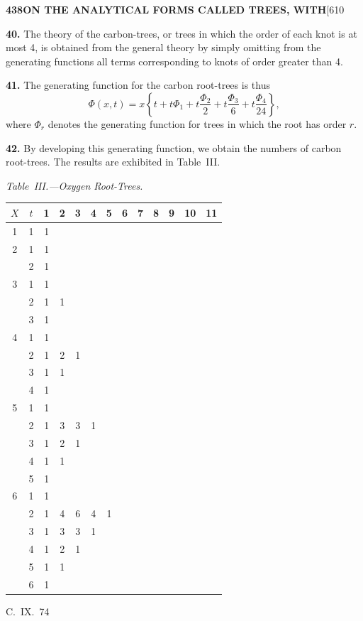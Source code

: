\documentclass[11pt,a4paper]{book}
\begin{document}
{\newpage
\noindent\textbf{438}\hspace{\fill}\textbf{ON THE ANALYTICAL FORMS CALLED TREES, WITH}\hspace{\fill}[610

\noindent\textbf{40.}
The theory of the carbon-trees, or trees in which the order of each knot is at most 4, is obtained from the general theory by simply omitting from the generating functions all terms corresponding to knots of order greater than 4.

\medskip
\noindent\textbf{41.}
The generating function for the carbon root-trees is thus
\[
\Phi(x,t) = x\left\{t + t\Phi_1 + t\frac{\Phi_2}{2} + t\frac{\Phi_3}{6} + t\frac{\Phi_4}{24}\right\},
\]
where $\Phi_r$ denotes the generating function for trees in which the root has order $r$.

\medskip
\noindent\textbf{42.}
By developing this generating function, we obtain the numbers of carbon root-trees. The results are exhibited in Table~III.

\medskip
\noindent\textit{Table~III.---Oxygen Root-Trees.}
\begin{center}
\small
\begin{longtable}{|c|c|c|c|c|c|c|c|c|c|c|c|c|}
\hline
$X$ & $t$ & 1 & 2 & 3 & 4 & 5 & 6 & 7 & 8 & 9 & 10 & 11 \\
\hline
\endfirsthead
1 & 1 & 1 & & & & & & & & & & \\
\hline
2 & 1 & 1 & & & & & & & & & & \\
  & 2 & 1 & & & & & & & & & & \\
\hline
3 & 1 & 1 & & & & & & & & & & \\
  & 2 & 1 & 1 & & & & & & & & & \\
  & 3 & 1 & & & & & & & & & & \\
\hline
4 & 1 & 1 & & & & & & & & & & \\
  & 2 & 1 & 2 & 1 & & & & & & & & \\
  & 3 & 1 & 1 & & & & & & & & & \\
  & 4 & 1 & & & & & & & & & & \\
\hline
5 & 1 & 1 & & & & & & & & & & \\
  & 2 & 1 & 3 & 3 & 1 & & & & & & & \\
  & 3 & 1 & 2 & 1 & & & & & & & & \\
  & 4 & 1 & 1 & & & & & & & & & \\
  & 5 & 1 & & & & & & & & & & \\
\hline
6 & 1 & 1 & & & & & & & & & & \\
  & 2 & 1 & 4 & 6 & 4 & 1 & & & & & & \\
  & 3 & 1 & 3 & 3 & 1 & & & & & & & \\
  & 4 & 1 & 2 & 1 & & & & & & & & \\
  & 5 & 1 & 1 & & & & & & & & & \\
  & 6 & 1 & & & & & & & & & & \\
\hline
\end{longtable}
\end{center}
\hfill C.~IX.\ 74

}
\end{document}
